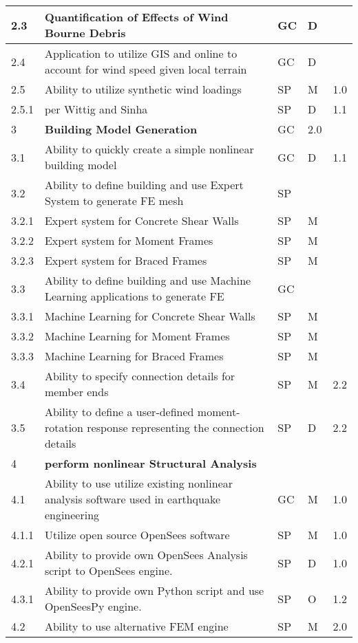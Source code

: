 \begin{longtable}{| p{} | p{} | p{} | p{} |  p{} |}
2.3 & Quantification of Effects of Wind Bourne Debris & GC & D & \\ \hline
2.4 & Application to utilize GIS and online to account for wind speed given local terrain & GC & D & \\ \hline
2.5 & Ability to utilize synthetic wind loadings & SP & M & 1.0  \\ \hline
2.5.1 & per Wittig and Sinha & SP & D & 1.1  \\ \hline
3 & \textbf{Building Model Generation} & GC & 2.0 \\ \hline
3.1 & Ability to quickly create a simple nonlinear building model & GC & D & 1.1 \\ \hline
3.2  & Ability to define building and use Expert System to generate FE mesh & SP & &  \\ \hline
	3.2.1 & Expert system for Concrete Shear Walls & SP & M &  \\ \hline
	3.2.2 & Expert system for Moment Frames & SP & M &  \\ \hline
	3.2.3 & Expert system for  Braced Frames & SP & M &   \\ \hline
3.3 & Ability to define building and use Machine Learning applications to generate FE & GC &  &  \\ \hline
	3.3.1 & Machine Learning for Concrete Shear Walls & SP & M &  \\ \hline
	3.3.2 & Machine Learning for Moment Frames & SP & M &  \\ \hline
	3.3.3 & Machine Learning for Braced Frames & SP & M &   \\ \hline
	3.4 & Ability to specify connection details for member ends & SP & M & 2.2 \\ \hline
	3.5 & Ability to define a user-defined moment-rotation response representing the connection details & SP & D & 2.2 \\ \hline
	4 & \textbf{perform nonlinear Structural Analysis} &  &  \\ \hline
4.1 & Ability to use utilize existing nonlinear analysis software used in earthquake engineering & GC & M & 1.0 \\ \hline
4.1.1 & Utilize open source OpenSees software & SP & M & 1.0 \\ \hline
4.2.1 & Ability to provide own OpenSees Analysis script to OpenSees engine. & SP & D & 1.0 \\ \hline
4.3.1 & Ability to provide own Python script and use OpenSeesPy engine. & SP & O & 1.2 \\ \hline
4.2 & Ability to use alternative FEM engine & SP & M & 2.0 \\ \hline

\end{longtable}
